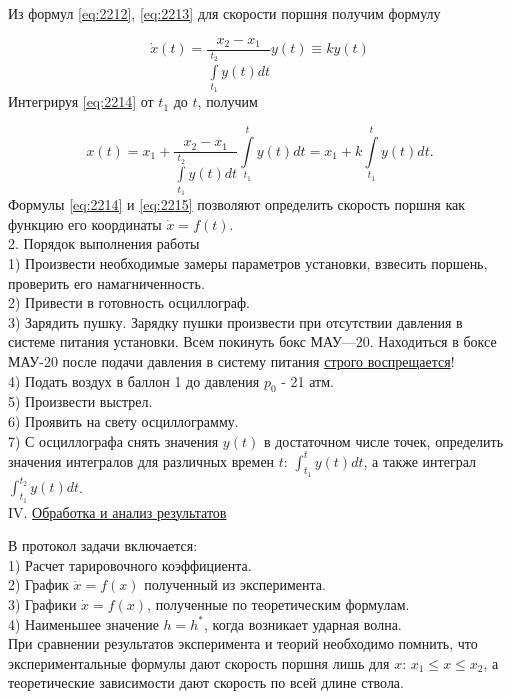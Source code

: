 \documentclass[specialist, subf, href, colorlinks=true, 14pt, final]{disser}
\theoremstyle{definition}
\begin{document}
Из формул \eqref{eq:2212}, \eqref{eq:2213} для скорости поршня получим формулу 
\addtocounter{equation}{1}
\begin{equation}\label{eq:2214}
	\dot{x}(t) = \frac{x_2 - x_1}{ \int\limits^{t_2}_{t_1} y(t)dt} y(t) \equiv k y(t) 
  \tag{14}
\end{equation}
Интегрируя \eqref{eq:2214} от $t_1$ до $t$, получим
\addtocounter{equation}{1}
\begin{equation}\label{eq:2215}
	x(t) = x_1 + \frac{x_2 - x_1}{ \int\limits^{t_2}_{t_1} y(t)dt}  \int\limits^{t}_{t_1} y(t)dt = x_1 + k  \int\limits^{t}_{t_1} y(t)dt.
  \tag{15}
\end{equation}
Формулы \eqref{eq:2214} и \eqref{eq:2215} позволяют определить скорость поршня как функцию его координаты $\dot{x} = f(t) $.\\

2. Порядок выполнения работы\\
1) Произвести необходимые замеры параметров установки, взвесить поршень, проверить его намагниченность.\\
2) Привести в готовность осциллограф.\\
3) Зарядить пушку. Зарядку пушки произвести при отсутствии давления в системе питания установки. Всем покинуть бокс МАУ—20. Находиться в боксе МАУ-20 после подачи давления в систему питания \underline{строго воспрещается}!\\
4) Подать воздух в баллон 1 до давления $p_0$ - 21 атм.\\
5) Произвести выстрел.\\
6) Проявить на свету осциллограмму.\\
7) С осциллографа снять значения $y(t)$ в достаточном числе точек, определить значения интегралов для различных времен $t$: $\int_{t_1}^{t} y(t)dt$, а также интеграл $\int_{t_1}^{t_2} y(t)dt$.\\

\noindent IV. \underline{Обработка и анализ результатов}

В протокол задачи включается:\\
1) Расчет тарировочного коэффициента.\\
2) График $\dot{x} = f(x)$ полученный из эксперимента.\\
3) Графики $\dot{x} = f(x)$, полученные по теоретическим формулам.\\
4) Наименьшее значение $h=h^*$, когда возникает ударная волна.\\

При сравнении результатов эксперимента и теорий необходимо помнить, что экспериментальные формулы дают скорость поршня лишь для $x$: $x_{1} \leqslant x \leqslant x_{2}$, а теоретические зависимости дают скорость по всей длине ствола.
\end{document}
